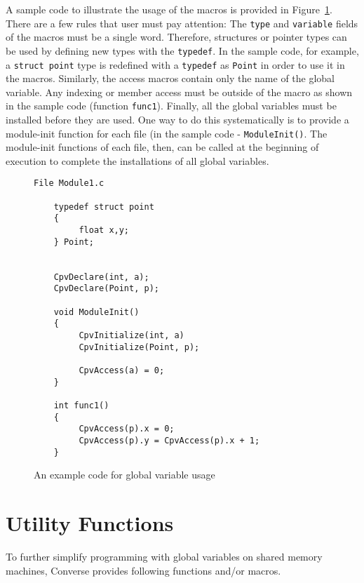     A sample code to illustrate the usage of the macros is provided
    in Figure~\ref{fig:cpv}.
    There are a few rules that user must pay attention: The
    {\tt type} and {\tt variable} fields of the macros must be a single
    word. Therefore, structures or pointer types can be used by defining
    new types with the {\tt typedef}. In the sample code, for example,
    a {\tt struct point} type is redefined with a {\tt typedef} as {\tt Point}
    in order to use it in the macros. Similarly,  the access macros contain
    only the name of the global variable. Any indexing or member access
    must be outside of the macro as shown in the sample code 
    (function {\tt func1}). Finally, all the global variables must be
    installed before they are used. One way to do this systematically is
    to provide a module-init function for each file (in the sample code - 
    {\tt ModuleInit()}. The module-init functions of each file, then, can be 
    called at the beginning of execution to complete the installations of 
    all global variables.
    
\begin{figure}
\begin{verbatim}
File Module1.c

    typedef struct point
    {
         float x,y;
    } Point;


    CpvDeclare(int, a);
    CpvDeclare(Point, p);

    void ModuleInit()
    {
         CpvInitialize(int, a)
         CpvInitialize(Point, p);

         CpvAccess(a) = 0;
    }

    int func1() 
    {
         CpvAccess(p).x = 0;
         CpvAccess(p).y = CpvAccess(p).x + 1;
    }
\end{verbatim}
\caption{An example code for global variable usage}
\label{fig:cpv}
\end{figure}

\section{Utility Functions}

To further simplify programming with global variables on shared memory machines,
Converse provides following functions and/or macros. 



